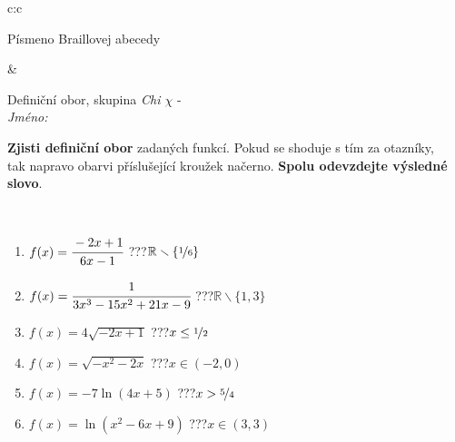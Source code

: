 \documentclass[10pt]{report}
\begin{document}
\begin{tabular}{c:c}
\begin{minipage}[c][104.5mm][t]{0.5\linewidth}
\begin{center}
\begin{minipage}{0.20\linewidth}
\begin{center}
{\small Písmeno Braillovej abecedy}
\end{center}
\end{minipage}
\end{center}
\end{minipage}
&
\begin{minipage}[c][104.5mm][t]{0.5\linewidth}
\begin{center}
\vspace{7mm}
{\huge Definiční obor, skupina \textit{Chi $\chi$} -}\\[5mm]
\textit{Jméno:}\phantom{xxxxxxxxxxxxxxxxxxxxxxxxxxxxxxxxxxxxxxxxxxxxxxxxxxxxxxxxxxxxxxxxx}\\[5mm]
\begin{minipage}{0.95\linewidth}
\begin{center}
\textbf{Zjisti definiční obor} zadaných funkcí. Pokud se shoduje s tím za otazníky,\\tak napravo obarvi příslušející kroužek načerno. \textbf{Spolu odevzdejte výsledné slovo}.
\end{center}
\end{minipage}
\\[1mm]
\begin{minipage}{0.79\linewidth}
\begin{center}
\begin{varwidth}{\linewidth}
\begin{enumerate}
\normalsizerrr
\item $f(x)=\cfrac{-2x+1}{6x-1}$\quad \dotfill\; ???\;\dotfill \quad $\mathbb{R}\smallsetminus\{\nicefrac{1}{6}\}$
\item $f(x)=\cfrac{1}{3x^3-15x^2+21x-9}$\quad \dotfill\; ???\;\dotfill \quad $\mathbb{R}\smallsetminus\{1,3\}$
\item $f(x)=4\sqrt{-2x+1}$\quad \dotfill\; ???\;\dotfill \quad $x\leq\nicefrac{1}{2}$
\item $f(x)=\sqrt{-x^2-2x}$\quad \dotfill\; ???\;\dotfill \quad $x\in(-2 , 0)$
\item $f(x)=-7\ln{(4x+5)}$\quad \dotfill\; ???\;\dotfill \quad $x>\nicefrac{5}{4}$
\item $f(x)=\ln{(x^2-6x+9)}$\quad \dotfill\; ???\;\dotfill \quad $x\in(3 , 3)$
\end{enumerate}
\end{varwidth}
\end{center}
\end{minipage}
\begin{minipage}{0.20\linewidth}
\begin{center}

\end{center}
\end{minipage}
\end{center}
\end{minipage}
\end{tabular}
\end{document}
